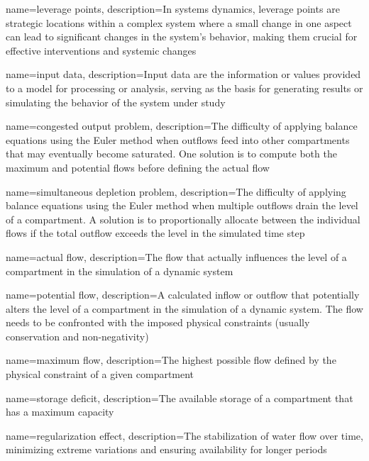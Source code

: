 {
    name=leverage points,
    description={In systems dynamics, leverage points are strategic locations within a complex system where a small change in one aspect can lead to significant changes in the system's behavior, making them crucial for effective interventions and systemic changes}
}

{
    name=input data,
    description={Input data are the information or values provided to a model for processing or analysis, serving as the basis for generating results or simulating the behavior of the system under study}
}

{
    name=congested output problem,
    description={The difficulty of applying balance equations using the Euler method when outflows feed into other compartments that may eventually become saturated. One solution is to compute both the maximum and potential flows before defining the actual flow}
}

{
    name=simultaneous depletion problem,
    description={The difficulty of applying balance equations using the Euler method when multiple outflows drain the level of a compartment. A solution is to proportionally allocate between the individual flows if the total outflow exceeds the level in the simulated time step}
}

{
    name=actual flow,
    description={The flow that actually influences the level of a compartment in the simulation of a dynamic system}
}

{
    name=potential flow,
    description={A calculated inflow or outflow that potentially alters the level of a compartment in the simulation of a dynamic system. The flow needs to be confronted with the imposed physical constraints (usually conservation and non-negativity)}
}

{
    name=maximum flow,
    description={The highest possible flow defined by the physical constraint of a given compartment}
}

{
    name=storage deficit,
    description={The available storage of a compartment that has a maximum capacity}
}

{
    name=regularization effect,
    description={The stabilization of water flow over time, minimizing extreme variations and ensuring availability for longer periods}
}

